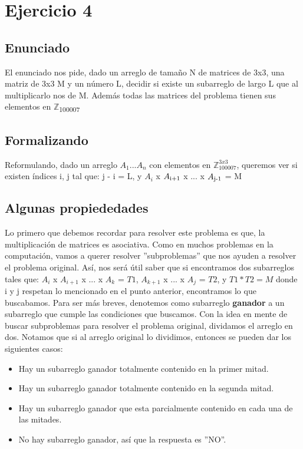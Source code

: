 \section{Ejercicio 4}

\subsection{Enunciado}
El enunciado nos pide, dado un arreglo de tamaño N de matrices de 3x3, una matriz de 3x3 M y un número L, decidir
si existe un subarreglo de largo L que al multiplicarlo nos de M.
Además todas las matrices del problema tienen sus elementos en $\mathbb{Z}$\textsubscript{100007}

\subsection{Formalizando}
Reformulando, dado un arreglo $A_1...A_n$ con elementos en  $\mathbb{Z}^{3x3}_{100007}$, queremos ver si existen índices
i, j tal que:
\newline
j - i = L, y 
\newline
$A_i$ x $A\textsubscript{i+1}$ x ... x $A\textsubscript{j-1}$ = M  

\subsection{Algunas propiededades}
Lo primero que debemos recordar para resolver este problema es que, la multiplicación de matrices es asociativa.
Como en muchos problemas en la computación, vamos a querer resolver ''subproblemas''
que nos ayuden a resolver el problema original. Así, nos será útil saber que si encontramos dos subarreglos tales que:
\newline
$A_i$ x $A_{i+1}$ x ... x $A_k$ = $T1$,
\newline
$A_{k+1}$ x ... x $A_j$ = $T2$, y 
\newline
$T1 * T2 = M$
\newline
donde i y j
respetan lo mencionado en el punto anterior, 
encontramos lo que buscabamos.
\newline
Para ser más breves, denotemos como subarreglo \textbf{ganador} a un subarreglo que cumple las condiciones que buscamos.
Con la idea en mente de buscar subproblemas para resolver el problema original, dividamos el arreglo en dos.
Notamos que si al arreglo original lo dividimos, entonces se pueden dar los siguientes casos:
\begin{itemize}
\item Hay un subarreglo ganador totalmente contenido en la primer mitad.
\item Hay un subarreglo ganador totalmente contenido en la segunda mitad.
\item Hay un subarreglo ganador que esta parcialmente contenido en cada una de las mitades.
\item No hay subarreglo ganador, así que la respuesta es ''NO''.
\end{itemize}

